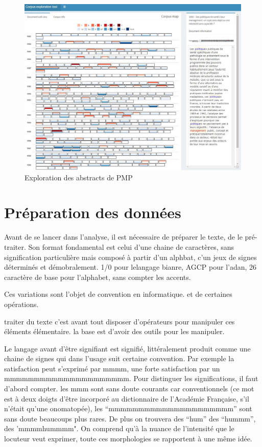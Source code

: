 \documentclass[
]{book}
\begin{document}
\begin{figure}
\centering
\includegraphics{./images/Corporaexplore.jpg}
\caption{Exploration des abstracts de PMP}
\end{figure}

\hypertarget{pruxe9paration-des-donnuxe9es}{%
\chapter{Préparation des données}\label{pruxe9paration-des-donnuxe9es}}

Avant de se lancer dans l'analyse, il est nécessaire de préparer le texte, de le pré-traiter. Son format fondamental est celui d'une chaine de caractères, sans signification particulière mais composé à partir d'un alphbat, c'un jeux de signes déterminés et démobralement. 1/0 pour lelangage bianre, AGCP pour l'adan, 26 caractère de base pour l'alphabet, sans compter les accents.

Ces variations sont l'objet de convention en informatique. et de certaines opérations.

traiter du texte c'est avant tout disposer d'opérateurs pour manipuler ces éléments élémentaire. la base est d'avoir des outils pour les manipuler.

Le langage avant d'être signifiant est signifié, littéralement produit comme une chaine de signes qui dans l'usage suit certaine convention. Par exemple la satisfaction peut s'exprimé par mmmm, une forte satisfaction par un mmmmmmmmmmmmmmmmmmmmm. Pour distinguer les significations, il faut d'abord compter. les mmm sont sans doute courants car conventionnels (ce mot est à deux doigts d'être incorporé au dictionnaire de l'Académie Française, s'il n'était qu'une onomatopée), les ``mmmmmmmmmmmmmmmmmmmmm'' sont sans doute beaucoups plus rares. De plus on trouvera des ``hum'' des ``hummm'', des 'mmmmhummmm". On comprend qu'à la nuance de l'intensité que le locuteur veut exprimer, toute ces morphologies se rapportent à une même idée.
\end{document}
